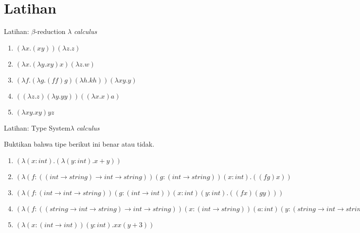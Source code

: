 \documentclass[aspectratio=1610,10pt,handout]{beamer}
\newcommand{\lc}{$\lambda$ {\it calculus}\ }
\begin{document}
\section{Latihan}
\begin{frame}{Latihan: $\beta$-reduction }{\lc}

	\begin{enumerate}
		\item<1-> $(\lambda x. (x y)) (\lambda z. z)$
		\item<2-> $(\lambda x. (\lambda y. x y) x) (\lambda z. w) $
		\item<3-> $(\lambda f.  (\lambda g. (f f) g) (\lambda h. k h) ) (\lambda x y. y)$
		\item<4-> $((\lambda z. z) (\lambda y. y y)) ((\lambda x. x) a)$
		\item<5-> $(\lambda x y. x y) y z	$
	\end{enumerate}


\end{frame}

\begin{frame}{Latihan: Type System}{\lc}

	Buktikan bahwa tipe berikut ini benar atau tidak.


	\begin{enumerate}
	    \item<1->  $(\lambda (x:int). (\lambda (y:int). x + y))$
		\item<2-> $(\lambda (f:((int\to string)\to int\to string)) (g:(int\to string)) (x:int). ((f g) x))$
		\item<3-> $(\lambda (f:(int\to int\to string)) (g:(int\to int)) (x:int) (y:int). ((f x) (g y)))$
		\item<4-> $(\lambda (f:((string\to int\to string)\to int\to string)) (x:(int\to string)) (a:int) (y:(string\to int\to string)). (y (x a)))$
		\item<5-> $(\lambda (x:(int\to int)) (y:int). x x (y + 3))$
	\end{enumerate}

\end{frame}
\end{document}
